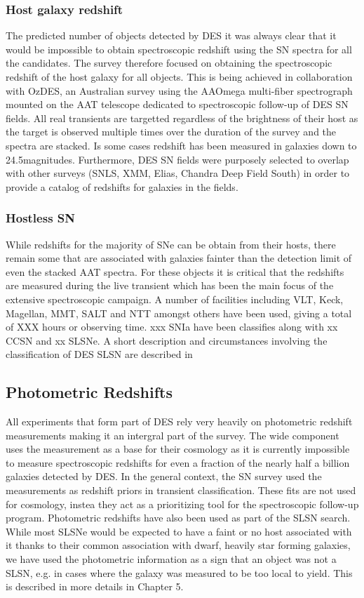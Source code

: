 \subsubsection{Host galaxy redshift}
The predicted number of objects detected by DES it was always clear that it would be impossible to obtain spectroscopic redshift using the SN spectra for all the candidates. The survey therefore focused on obtaining the spectroscopic redshift of the host galaxy for all objects. This is being achieved in collaboration with OzDES, an Australian survey using the AAOmega multi-fiber spectrograph mounted on the AAT telescope dedicated to spectroscopic follow-up of DES SN fields. All real transients are targetted regardless of the brightness of their host as the target is observed multiple times over the duration of the survey and the spectra are stacked. Is some cases redshift has been measured in galaxies down to 24.5magnitudes. Furthermore, DES SN fields were purposely selected to overlap with other surveys (SNLS, XMM, Elias, Chandra Deep Field South) in order to provide a catalog of redshifts for galaxies in the fields.

\subsubsection{Hostless SN}
While redshifts for the majority of SNe can be obtain from their hosts, there remain some that are associated with galaxies fainter than the detection limit of even the stacked AAT spectra. For these objects it is critical that the redshifts are measured during the live transient which has been the main focus of the extensive spectroscopic campaign. A number of facilities including VLT, Keck, Magellan, MMT, SALT and NTT amongst others have been used, giving a total of XXX hours or observing time. xxx SNIa have been classifies along with xx CCSN and xx SLSNe. A short description and circumstances involving the classification of DES SLSN are described in 

\subsection{Photometric Redshifts}
All experiments that form part of DES rely very heavily on photometric redshift measurements making it an intergral part of the survey. The wide component uses the measurement as a base for their cosmology as it is currently impossible to measure spectroscopic redshifts for even a fraction of the nearly half a billion galaxies detected by DES. In the general context, the SN survey used the measurements as redshift priors in transient classification. These fits are not used for cosmology, instea they act as a prioritizing tool for the spectroscopic follow-up program. Photometric redshifts have also been used as part of the SLSN search. While most SLSNe would be expected to have a faint or no host associated with it thanks to their common association with dwarf, heavily star forming galaxies, we have used the photometric information as a sign that an object was not a SLSN, e.g. in cases where the galaxy was measured to be too local to yield. This is described in more details in Chapter 5. 

